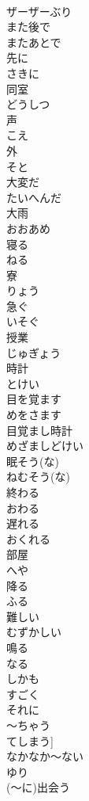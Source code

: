 \documentclass[8pt]{extreport}
\begin{document}
\begin{CJK}{UTF8}{min}
\\	ザーザーぶり
\\	また後で	
\\	またあとで
\\	先に	
\\	さきに
\\	同室	
\\	どうしつ
\\	声	
\\	こえ
\\	外	
\\	そと
\\	大変だ	
\\	たいへんだ
\\	大雨	
\\	おおあめ
\\	寝る	
\\	ねる
\\	寮	
\\	りょう
\\	急ぐ	
\\	いそぐ
\\	授業	
\\	じゅぎょう
\\	時計	
\\	とけい
\\	目を覚ます	
\\	めをさます
\\	目覚まし時計	
\\	めざましどけい
\\	眠そう(な)	
\\	ねむそう(な)
\\	終わる	
\\	おわる
\\	遅れる	
\\	おくれる
\\	部屋	
\\	へや
\\	降る	
\\	ふる
\\	難しい	
\\	むずかしい
\\	鳴る	
\\	なる
\\	しかも	
\\	すごく	
\\	それに	
\\	～ちゃう	
\\	てしまう]	
\\	なかなか～ない	
\\	ゆり	
\\	(～に)出会う	

\end{CJK}
\end{document}

